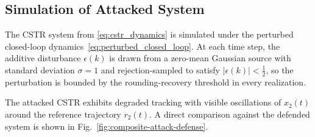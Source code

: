 \subsection{Simulation of Attacked System}

The CSTR system from \eqref{eq:cstr_dynamics} is simulated under the
perturbed closed-loop dynamics~\eqref{eq:perturbed_closed_loop}. At each
time step, the additive disturbance $\epsilon(k)$ is drawn from a zero-mean
Gaussian source with standard deviation $\sigma = 1$ and rejection-sampled
to satisfy $|\epsilon(k)| < \tfrac{1}{2}$, so the perturbation is bounded by
the rounding-recovery threshold in every realization.

The attacked CSTR exhibits degraded tracking with visible
oscillations of $x_2(t)$ around the reference trajectory $r_2(t)$.
A direct comparison against the defended system is shown in
Fig.~\ref{fig:composite-attack-defense}.
